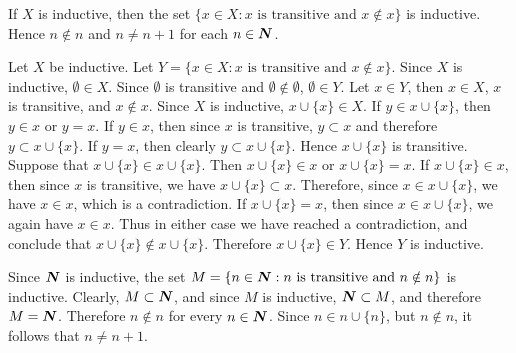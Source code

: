  If $X$ is inductive, then the set
$\{ x \in X : x \text{ is transitive and } x \notin x \}$ is
inductive. Hence $n \notin n$ and $n \neq n + 1$ for each
$n \in \boldsymbol{N}$.
\begin{solution}
  Let $X$ be inductive. Let
  $Y = \{ x \in X : x \text{ is transitive and } x \notin x \}$.
  Since $X$ is inductive, $\emptyset \in X$. Since $\emptyset$ is
  transitive and $\emptyset \notin \emptyset$, $\emptyset \in Y$.
  Let $x \in Y$, then $x \in X$, $x$ is transitive, and 
  $x \notin x$. Since $X$ is inductive, $x \cup \{ x \} \in X$.
  If $y \in x \cup \{ x \}$, then $y \in x$ or $y = x$. If
  $y \in x$, then since $x$ is transitive, $y \subset x$ and
  therefore $y \subset x \cup \{ x \}$. If $y = x$, then clearly
  $ y \subset x \cup \{ x \}$. Hence $x \cup \{ x \}$ is
  transitive. Suppose that $x \cup \{ x \} \in x \cup \{ x \}$.
  Then $x \cup \{ x \} \in x$ or $x \cup \{ x \} = x$. If
  $x \cup \{ x \} \in x$, then since $x$ is transitive, we have
  $x \cup \{ x \} \subset x$. Therefore, since 
  $x \in x \cup \{ x \}$, we have $x \in x$, which is a
  contradiction. If $x \cup \{ x \} = x$, then since
  $x \in x \cup \{ x \}$, we again have $x \in x$. Thus in either
  case we have reached a contradiction, and conclude that
  $x \cup \{ x \} \notin x \cup \{ x \}$. Therefore
  $x \cup \{ x \} \in Y$. Hence $Y$ is inductive.

  Since $\boldsymbol{N}$ is inductive, the set
  $M = \{ n \in \boldsymbol{N} : n \text{ is transitive and } n \notin n \}$
  is inductive. Clearly, $M \subset \boldsymbol{N}$, and since $M$ is inductive, $\boldsymbol{N} \subset M$, and therefore $M = \boldsymbol{N}$. Therefore
  $n \notin n$ for every $n \in \boldsymbol{N}$. Since
  $n \in n \cup \{ n \}$, but $n \notin n$, it follows that
  $n \neq n + 1$.
\end{solution}